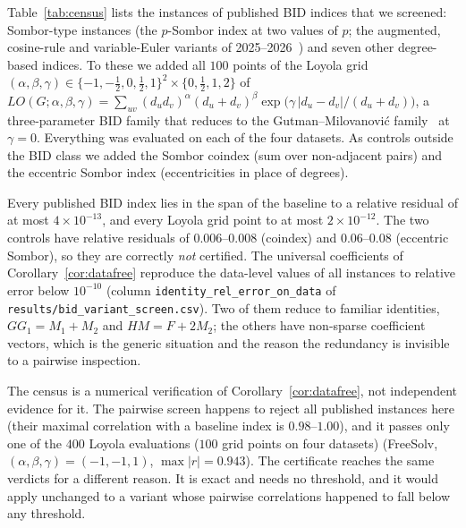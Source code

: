 \documentclass[11pt,a4paper]{article}
\theoremstyle{definition}
\begin{document}
Table~\ref{tab:census} lists the \nCensusInst{} instances of
\nCensusIdx{} published BID indices that we screened: \nSomborInst{}
Sombor-type instances (the $p$-Sombor index at two values of $p$; the
augmented, cosine-rule and variable-Euler variants of
2025--2026~\cite{DasGutmanAli2026ASO,NyauliBuragohain2026CoRSO,GutmanRedzepovicKizilirmakKulli2025Euler})
and seven other degree-based indices. To these we added all $100$
points of the Loyola grid
$(\alpha,\beta,\gamma)\in\{-1,-\tfrac12,0,\tfrac12,1\}^2\times\{0,\tfrac12,1,2\}$
of $LO(G;\alpha,\beta,\gamma)=\sum_{uv}(d_ud_v)^\alpha(d_u+d_v)^\beta
\exp\bigl(\gamma\,|d_u-d_v|/(d_u+d_v)\bigr)$, a three-parameter BID
family that reduces to the Gutman--Milovanovi\'c
family~\cite{GutmanMilovanovic2020AKCE} at $\gamma=0$.
Everything was evaluated on each of the four datasets. As controls
outside the BID class we added the Sombor coindex (sum over
non-adjacent pairs) and the eccentric Sombor index (eccentricities in
place of degrees).



Every published BID index lies in the span of the baseline to a relative
residual of at most $4\times10^{-13}$, and every Loyola grid point to
at most $2\times10^{-12}$. The two controls have relative residuals
of $0.006$--$0.008$ (coindex) and $0.06$--$0.08$ (eccentric Sombor),
so they are correctly \emph{not} certified. The universal
coefficients of Corollary~\ref{cor:datafree} reproduce the
data-level values of all \nCensusInst{} instances to relative error
below $10^{-10}$ (column \texttt{identity\_rel\_error\_on\_data} of
\texttt{results/bid\_variant\_screen.csv}).
Two of them reduce to familiar identities, $GG_1 = M_1+M_2$ and
$HM = F+2M_2$; the others have non-sparse coefficient vectors, which
is the generic situation and the reason the redundancy is invisible
to a pairwise inspection.

The census is a numerical verification of
Corollary~\ref{cor:datafree}, not independent evidence for it. The
pairwise screen happens to reject all \nCensusInst{} published instances
here (their maximal correlation with a baseline index is $0.98$--$1.00$),
and it passes only one of the $400$ Loyola evaluations ($100$ grid points
on four datasets) (FreeSolv,
$(\alpha,\beta,\gamma)=(-1,-1,1)$, $\max|r|=0.943$). The certificate
reaches the same verdicts for a different reason. It is exact and
needs no threshold, and it would apply unchanged to a variant whose
pairwise correlations happened to fall below any threshold.
\end{document}
